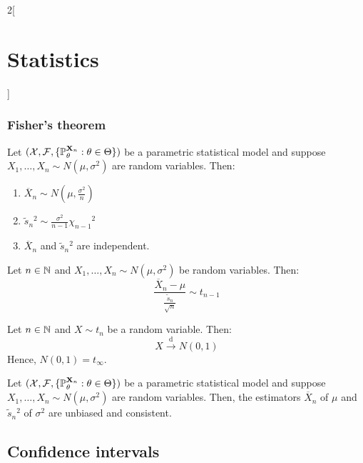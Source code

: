 \documentclass[../../../main.tex]{subfiles}
\begin{document}
\begin{multicols}{2}[\section{Statistics}]
  \subsubsection{Fisher's theorem}
  \begin{theorem}
    Let $(\mathcal{X},\mathcal{F},\{\mathbb{P}_\theta^{\boldsymbol{\mathrm{X}}_n}:\theta\in\Theta\})$ be a parametric statistical model and suppose $X_1,\ldots,X_n\sim N(\mu,\sigma^2)$ are \iid random variables. Then:
    \begin{enumerate}
      \item $\overline{X}_n\sim N\left(\mu,\frac{\sigma^2}{n}\right)$
      \item $\tilde{s}_n{}^2\sim\frac{\sigma^2}{n-1}{\chi_{n-1}}^2$
      \item $\overline{X}_n$ and $\tilde{s}_n{}^2$ are independent.
    \end{enumerate}
  \end{theorem}
  \begin{corollary}
    Let $n\in\mathbb{N}$ and $X_1,\ldots,X_n\sim N(\mu,\sigma^2)$ be \iid random variables. Then: $$\frac{\overline{X}_n-\mu}{\frac{\tilde{s}_n}{\sqrt{n}}}\sim t_{n-1}$$
  \end{corollary}
  \begin{corollary}
    Let $n\in\mathbb{N}$ and $X\sim t_n$ be a random variable. Then: $$X\overset{\text{d}}{\longrightarrow }N\left(0,1\right)$$
    Hence, $N(0,1)=t_\infty$.
  \end{corollary}
  \begin{corollary}
    Let $(\mathcal{X},\mathcal{F},\{\mathbb{P}_\theta^{\boldsymbol{\mathrm{X}}_n}:\theta\in\Theta\})$ be a parametric statistical model and suppose $X_1,\ldots,X_n\sim N(\mu,\sigma^2)$ are \iid random variables. Then, the estimators $\overline{X}_n$ of $\mu$ and $\tilde{s}_n{}^2$ of $\sigma^2$ are unbiased and consistent.
  \end{corollary}
  \begin{center}
    \begin{minipage}{\linewidth}
      \centering
      
    \end{minipage}
  \end{center}
  \subsection{Confidence intervals}

\end{multicols}
\end{document}
